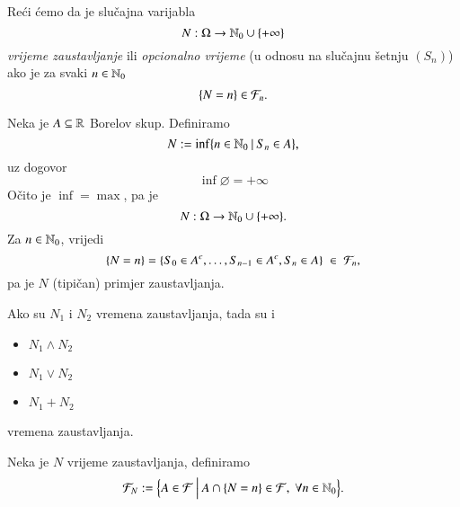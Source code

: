 \begin{defn}    \label{defn:15.2-1}
    Re\' ci \' cemo da je slu\v cajna varijabla
    \begin{equation*}
        N : \Omega \to  \mathbb{N}_0 \cup \{ +\infty \}
    \end{equation*}
    \emph{vrijeme zaustavljanje} ili \emph{opcionalno vrijeme} (u odnosu na slu\v cajnu \v setnju $(S_n)$) ako je za svaki $n \in \mathbb{N}_0$
    \begin{equation*}
        \{ N = n \} \in \mathcal{F}_n.
    \end{equation*}
\end{defn}

\begin{pr}  \label{pr:15.3}
    Neka je $A \subseteq \mathbb{R}$ Borelov skup.
    Definiramo
    \begin{equation*}
        N := \inf \{{n \in \mathbb{N}_0} \: | \: {S_n \in A}\},
    \end{equation*}
    uz dogovor
    \begin{equation*}
        \inf \varnothing = +\infty
    \end{equation*}
    O\v cito je $\inf = \max$, pa je
    \begin{equation*}
        N: \Omega \to \mathbb{N}_0 \cup \{+\infty\}.
    \end{equation*}
    Za $n \in \mathbb{N}_0$, vrijedi
    \begin{equation*}
        \{ N = n \} = \{ S_0 \in A^c, \ldots, S_{n - 1} \in A^c, S_n \in A \} \; \in \; \mathcal{F}_n,
    \end{equation*}
    pa je $N$ (tipi\v can) primjer zaustavljanja.
\end{pr}

\begin{zad} \label{zad:15.4}
    Ako su $N_1$ i $N_2$ vremena zaustavljanja, tada su i
    \begin{itemize}
        \item[] $N_1 \land N_2$
        \item[] $N_1 \lor N_2$
        \item[] $N_1 + N_2$  
    \end{itemize}
    vremena zaustavljanja.
\end{zad}

\begin{defn}    \label{defn:15.4-1}
    Neka je $N$ vrijeme zaustavljanja, definiramo
    \begin{equation}    \label{jed:15.5}
        \mathcal{F}_N := \Big\{{A \in \mathcal{F}} \: \Big| \: {A \cap \{N = n\} \in \mathcal{F}, \; \forall n \in \mathbb{N}_0 }\Big\}.
    \end{equation}
\end{defn}

